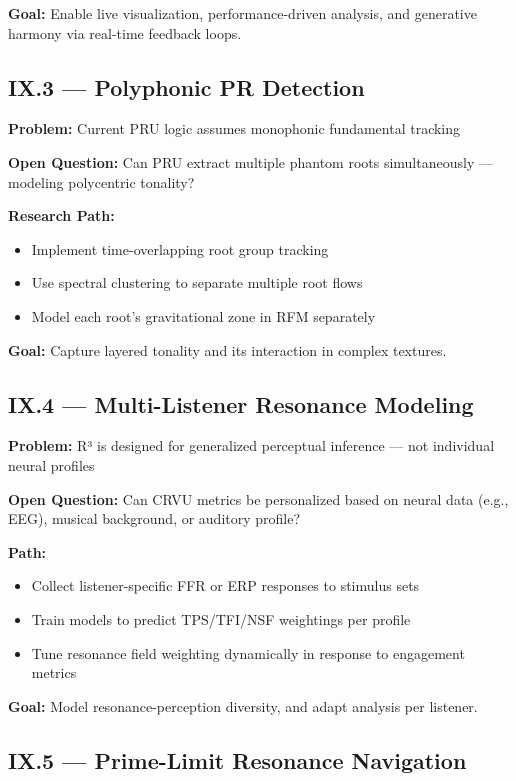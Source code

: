 \documentclass{article}
\begin{document}
\textbf{Goal:}  
Enable live visualization, performance-driven analysis, and generative harmony via real-time feedback loops.

\subsection*{IX.3 — Polyphonic PR Detection}

\textbf{Problem:}  
Current PRU logic assumes monophonic fundamental tracking

\textbf{Open Question:}  
Can PRU extract multiple phantom roots simultaneously — modeling polycentric tonality?

\textbf{Research Path:}
\begin{itemize}
    \item Implement time-overlapping root group tracking
    \item Use spectral clustering to separate multiple root flows
    \item Model each root’s gravitational zone in RFM separately
\end{itemize}

\textbf{Goal:}  
Capture layered tonality and its interaction in complex textures.

\subsection*{IX.4 — Multi-Listener Resonance Modeling}

\textbf{Problem:}  
R³ is designed for generalized perceptual inference — not individual neural profiles

\textbf{Open Question:}  
Can CRVU metrics be personalized based on neural data (e.g., EEG), musical background, or auditory profile?

\textbf{Path:}
\begin{itemize}
    \item Collect listener-specific FFR or ERP responses to stimulus sets
    \item Train models to predict TPS/TFI/NSF weightings per profile
    \item Tune resonance field weighting dynamically in response to engagement metrics
\end{itemize}

\textbf{Goal:}  
Model resonance-perception diversity, and adapt analysis per listener.

\subsection*{IX.5 — Prime-Limit Resonance Navigation}
\end{document}

